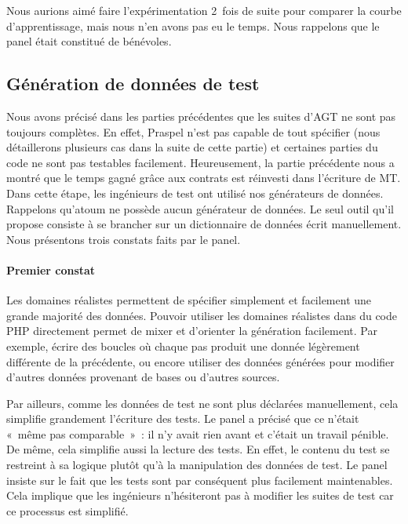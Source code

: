 Nous aurions aimé faire l'expérimentation 2~fois de suite pour comparer la
courbe d'apprentissage, mais nous n'en avons pas eu le temps. Nous rappelons que
le panel était constitué de bénévoles.

\subsection{Génération de données de test}
\label{subsection:experimentation:data}

Nous avons précisé dans les parties précédentes que les suites d'AGT ne sont pas
toujours complètes. En effet, Praspel n'est pas capable de tout spécifier (nous
détaillerons plusieurs cas dans la suite de cette partie) et certaines parties
du code ne sont pas testables facilement. Heureusement, la partie précédente
nous a montré que le temps gagné grâce aux contrats est réinvesti dans
l'écriture de MT. Dans cette étape, les ingénieurs de test ont utilisé nos
générateurs de données. Rappelons qu'atoum ne possède aucun générateur de
données. Le seul outil qu'il propose consiste à se brancher sur un dictionnaire
de données écrit manuellement. Nous présentons trois constats faits par le
panel.

\paragraph{Premier constat} Les domaines réalistes permettent de spécifier
simplement et facilement une grande majorité des données. Pouvoir utiliser les
domaines réalistes dans du code PHP directement permet de mixer et d'orienter la
génération facilement. Par exemple, écrire des boucles où chaque pas produit une
donnée légèrement différente de la précédente, ou encore utiliser des données
générées pour modifier d'autres données provenant de bases ou d'autres sources.

Par ailleurs, comme les données de test ne sont plus déclarées manuellement,
cela simplifie grandement l'écriture des tests. Le panel a précisé que ce
n'était «~même pas comparable~»~: il n'y avait rien avant et c'était un travail
pénible. De même, cela simplifie aussi la lecture des tests. En effet, le
contenu du test se restreint à sa logique plutôt qu'à la manipulation des
données de test. Le panel insiste sur le fait que les tests sont par conséquent
plus facilement maintenables. Cela implique que les ingénieurs n'hésiteront pas
à modifier les suites de test car ce processus est simplifié.

